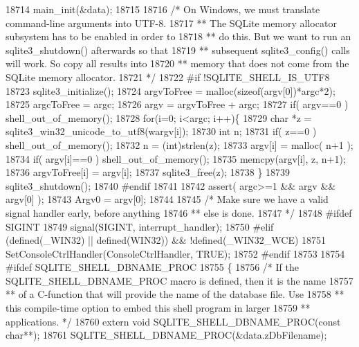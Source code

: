 \begin{DoxyCode}
{{18714   main_init(&data);
18715 
18716   \textcolor{comment}{/* On Windows, we must translate command-line arguments into UTF-8.}
18717 \textcolor{comment}{  ** The SQLite memory allocator subsystem has to be enabled in order to}
18718 \textcolor{comment}{  ** do this.  But we want to run an sqlite3\_shutdown() afterwards so that}
18719 \textcolor{comment}{  ** subsequent sqlite3\_config() calls will work.  So copy all results into}
18720 \textcolor{comment}{  ** memory that does not come from the SQLite memory allocator.}
18721 \textcolor{comment}{  */}
18722 \textcolor{preprocessor}{#if !SQLITE\_SHELL\_IS\_UTF8}
18723   sqlite3_initialize();
18724   argvToFree = malloc(\textcolor{keyword}{sizeof}(argv[0])*argc*2);
18725   argcToFree = argc;
18726   argv = argvToFree + argc;
18727   \textcolor{keywordflow}{if}( argv==0 ) shell_out_of_memory();
18728   \textcolor{keywordflow}{for}(i=0; i<argc; i++)\{
18729     \textcolor{keywordtype}{char} *z = sqlite3\_win32\_unicode\_to\_utf8(wargv[i]);
18730     \textcolor{keywordtype}{int} n;
18731     \textcolor{keywordflow}{if}( z==0 ) shell_out_of_memory();
18732     n = (int)strlen(z);
18733     argv[i] = malloc( n+1 );
18734     \textcolor{keywordflow}{if}( argv[i]==0 ) shell_out_of_memory();
18735     memcpy(argv[i], z, n+1);
18736     argvToFree[i] = argv[i];
18737     sqlite3_free(z);
18738   \}
18739   sqlite3_shutdown();
18740 \textcolor{preprocessor}{#endif}
18741 
18742   assert( argc>=1 && argv && argv[0] );
18743   Argv0 = argv[0];
18744 
18745   \textcolor{comment}{/* Make sure we have a valid signal handler early, before anything}
18746 \textcolor{comment}{  ** else is done.}
18747 \textcolor{comment}{  */}
18748 \textcolor{preprocessor}{#ifdef SIGINT}
18749   signal(SIGINT, interrupt_handler);
18750 \textcolor{preprocessor}{#elif (defined(\_WIN32) || defined(WIN32)) && !defined(\_WIN32\_WCE)}
18751   SetConsoleCtrlHandler(ConsoleCtrlHandler, TRUE);
18752 \textcolor{preprocessor}{#endif}
18753 
18754 \textcolor{preprocessor}{#ifdef SQLITE\_SHELL\_DBNAME\_PROC}
18755   \{
18756     \textcolor{comment}{/* If the SQLITE\_SHELL\_DBNAME\_PROC macro is defined, then it is the name}
18757 \textcolor{comment}{    ** of a C-function that will provide the name of the database file.  Use}
18758 \textcolor{comment}{    ** this compile-time option to embed this shell program in larger}
18759 \textcolor{comment}{    ** applications. */}
18760     \textcolor{keyword}{extern} \textcolor{keywordtype}{void} SQLITE\_SHELL\_DBNAME\_PROC(\textcolor{keyword}{const} \textcolor{keywordtype}{char}**);
18761     SQLITE\_SHELL\_DBNAME\_PROC(&data.zDbFilename);
}}
\end{DoxyCode}
